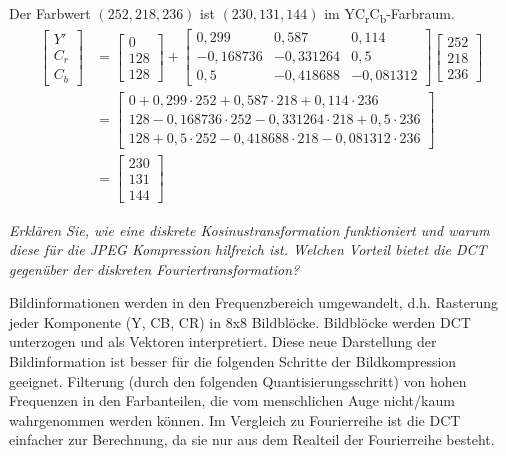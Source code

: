 \documentclass[
  ngerman,
  DIV=14
]{scrartcl}
\begin{document}
Der Farbwert $(252, 218, 236)$ ist $(230, 131, 144)$ im YC\textsubscript{r}C\textsubscript{b}-Farbraum.
\begin{align*}
\begin{bmatrix}Y'\\C_r\\C_b\end{bmatrix}
&= \begin{bmatrix}0\\128\\128\end{bmatrix}
+ \begin{bmatrix}0,299&0,587&0,114\\-0,168736&-0,331264&0,5\\0,5&-0,418688&-0,081312\end{bmatrix}
\begin{bmatrix}252\\218\\236\end{bmatrix}\\
&= \begin{bmatrix}
0+0,299\cdot252+0,587\cdot218+0,114\cdot236\\
128−0,168736\cdot252−0,331264\cdot218+0,5\cdot236\\
128+0,5\cdot252-0,418688\cdot218-0,081312\cdot 236
\end{bmatrix}\\
&= \begin{bmatrix}230\\131\\144\end{bmatrix}
\end{align*}

\emph{Erklären Sie, wie eine diskrete Kosinustransformation funktioniert und warum diese für die JPEG Kompression hilfreich ist. Welchen Vorteil bietet die DCT gegenüber der diskreten Fouriertransformation?}

Bildinformationen werden in den Frequenzbereich umgewandelt, d.h. Rasterung jeder Komponente (Y, CB, CR) in 8x8 Bildblöcke. Bildblöcke werden DCT unterzogen und als Vektoren interpretiert. Diese neue Darstellung der Bildinformation ist besser für die folgenden Schritte der Bildkompression geeignet. Filterung (durch den folgenden Quantisierungsschritt) von hohen Frequenzen in den Farbanteilen, die vom menschlichen Auge nicht/kaum wahrgenommen werden können. Im Vergleich zu Fourierreihe ist die DCT einfacher zur Berechnung, da sie nur aus dem Realteil der Fourierreihe besteht.
\end{document}
